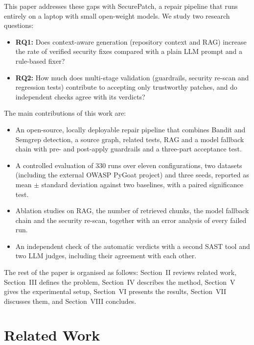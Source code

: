 \documentclass[12pt,onecolumn,draftclsnofoot]{IEEEtran}
\begin{document}
This paper addresses these gaps with SecurePatch, a repair pipeline that runs entirely on a laptop with small open-weight models. We study two research questions:
\begin{itemize}
\item \textbf{RQ1:} Does context-aware generation (repository context and RAG) increase the rate of verified security fixes compared with a plain LLM prompt and a rule-based fixer?
\item \textbf{RQ2:} How much does multi-stage validation (guardrails, security re-scan and regression tests) contribute to accepting only trustworthy patches, and do independent checks agree with its verdicts?
\end{itemize}

The main contributions of this work are:
\begin{itemize}
\item An open-source, locally deployable repair pipeline that combines Bandit and Semgrep detection, a source graph, related tests, RAG and a model fallback chain with pre- and post-apply guardrails and a three-part acceptance test.
\item A controlled evaluation of 330 runs over eleven configurations, two datasets (including the external OWASP PyGoat project) and three seeds, reported as mean $\pm$ standard deviation against two baselines, with a paired significance test.
\item Ablation studies on RAG, the number of retrieved chunks, the model fallback chain and the security re-scan, together with an error analysis of every failed run.
\item An independent check of the automatic verdicts with a second SAST tool and two LLM judges, including their agreement with each other.
\end{itemize}

The rest of the paper is organised as follows: Section~II reviews related work, Section~III defines the problem, Section~IV describes the method, Section~V gives the experimental setup, Section~VI presents the results, Section~VII discusses them, and Section~VIII concludes.

\section{Related Work}
\end{document}
